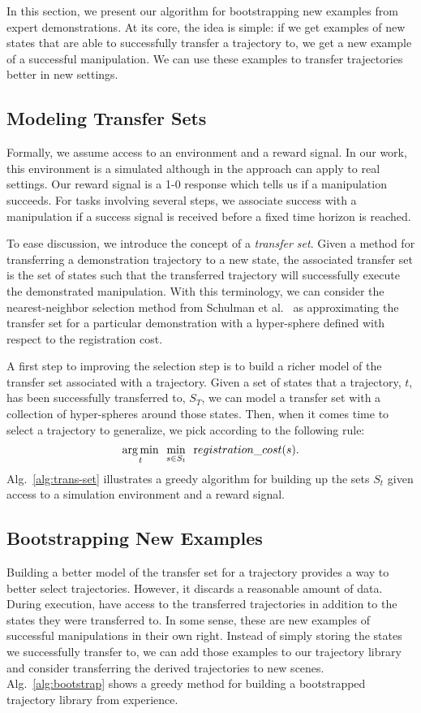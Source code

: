 In this section, we present our algorithm for bootstrapping new examples 
from expert demonstrations. At its core, the idea is simple: if we get
examples of new states that are able to successfully transfer a trajectory to,
we get a new example of a successful manipulation. We can use these examples
to transfer trajectories better in new settings.

\subsection{Modeling Transfer Sets}
Formally, we assume access to an environment and a reward signal. In our work, this
environment is a simulated although in the approach can apply to real settings. 
Our reward signal is a 1-0 response which tells us if a manipulation succeeds. For 
tasks involving several steps, we associate success with a manipulation if a success
signal is received before a fixed time horizon is reached.

To ease discussion, we introduce the concept of a \emph{transfer set}. Given a method for
transferring a demonstration trajectory to a new state, the associated transfer set is
the set of states such that the transferred trajectory will successfully execute the
demonstrated manipulation. With this terminology, we can consider the nearest-neighbor
selection method from Schulman et al.~\cite{Schulmanetal_ISRR2013} as approximating the
transfer set for a particular demonstration with a hyper-sphere defined with respect
to the registration cost.

A first step to improving the selection step is to build a richer
model of the transfer set associated with a trajectory. Given a set of
states that a trajectory, $t$,  has been successfully transferred to, $S_T$, we can
model a transfer set with a collection of hyper-spheres around those states.
Then, when it comes time to select a trajectory to generalize, we pick according to
the following rule:
\begin{equation}
\underset{t}{\operatorname*{arg\,min}} \ \ \underset{s\in S_t}{\min} \ \ {\text registration\_cost}(s).
\end{equation}
Alg.~\ref{alg:trans-set} illustrates a greedy algorithm for building up the sets $S_t$ given
access to a simulation environment and a reward signal. 

\subsection{Bootstrapping New Examples}
Building a better model of the transfer set for a trajectory provides a way
to better select trajectories. However, it discards a reasonable amount of
data. During execution, have access to the transferred trajectories in addition
to the states they were transferred to. In some sense, these are new examples of 
successful manipulations in their own right. Instead of simply storing
the states we successfully transfer to, we can add those examples to our trajectory 
library and consider transferring the derived trajectories to new scenes. 
Alg.~\ref{alg:bootstrap} shows a greedy method for building a bootstrapped trajectory
library from experience.

